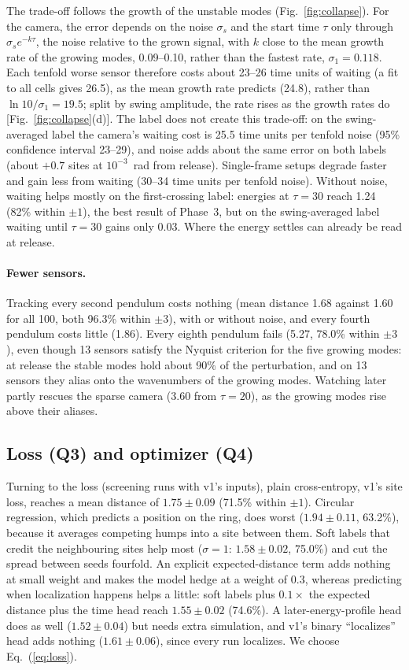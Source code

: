 \documentclass[11pt]{article}
\begin{document}
The trade-off follows the growth of the unstable modes (Fig.~\ref{fig:collapse}). For the camera, the error depends on the noise $\sigma_s$ and the start time $\tau$ only through $\sigma_s e^{-k\tau}$, the noise relative to the grown signal, with $k$ close to the mean growth rate of the growing modes, 0.09--0.10, rather than the fastest rate, $\sigma_1=0.118$. Each tenfold worse sensor therefore costs about 23--26 time units of waiting (a fit to all cells gives 26.5), as the mean growth rate predicts (24.8), rather than $\ln10/\sigma_1=19.5$; split by swing amplitude, the rate rises as the growth rates do [Fig.~\ref{fig:collapse}(d)]. The label does not create this trade-off: on the swing-averaged label the camera's waiting cost is 25.5 time units per tenfold noise (95\% confidence interval 23--29), and noise adds about the same error on both labels (about $+0.7$ sites at $10^{-3}$~rad from release). Single-frame setups degrade faster and gain less from waiting (30--34 time units per tenfold noise). Without noise, waiting helps mostly on the first-crossing label: energies at $\tau=30$ reach 1.24 (82\% within $\pm1$), the best result of Phase~3, but on the swing-averaged label waiting until $\tau=30$ gains only 0.03. Where the energy settles can already be read at release.

\paragraph{Fewer sensors.} Tracking every second pendulum costs nothing (mean distance 1.68 against 1.60 for all 100, both 96.3\% within $\pm3$), with or without noise, and every fourth pendulum costs little (1.86). Every eighth pendulum fails (5.27, 78.0\% within $\pm3$), even though 13 sensors satisfy the Nyquist criterion for the five growing modes: at release the stable modes hold about 90\% of the perturbation, and on 13 sensors they alias onto the wavenumbers of the growing modes. Watching later partly rescues the sparse camera (3.60 from $\tau=20$), as the growing modes rise above their aliases.

\subsection{Loss (Q3) and optimizer (Q4)}
\label{sec:loss}

Turning to the loss (screening runs with v1's inputs), plain cross-entropy, v1's site loss, reaches a mean distance of $1.75\pm0.09$ (71.5\% within $\pm1$). Circular regression, which predicts a position on the ring, does worst ($1.94\pm0.11$, 63.2\%), because it averages competing humps into a site between them. Soft labels that credit the neighbouring sites help most ($\sigma=1$: $1.58\pm0.02$, 75.0\%) and cut the spread between seeds fourfold. An explicit expected-distance term adds nothing at small weight and makes the model hedge at a weight of 0.3, whereas predicting when localization happens helps a little: soft labels plus $0.1\times$ the expected distance plus the time head reach $1.55\pm0.02$ (74.6\%). A later-energy-profile head does as well ($1.52\pm0.04$) but needs extra simulation, and v1's binary ``localizes'' head adds nothing ($1.61\pm0.06$), since every run localizes. We choose Eq.~(\ref{eq:loss}).
\end{document}
